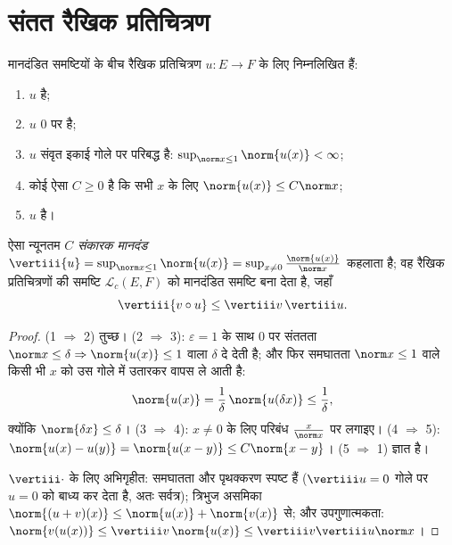\section{संतत रैखिक प्रतिचित्रण}

\begin{theorem}[अभिलक्षण]\label{thm:b2:nvs:continuouslinear}
मानदंडित समष्टियों के बीच रैखिक प्रतिचित्रण $u \colon E \to F$ के लिए निम्नलिखित 
हैं:
\begin{enumerate}
  \item $u$  है;
  \item $u$ $0$ पर  है;
  \item $u$ संवृत इकाई गोले पर परिबद्ध है: $\sup_{\norm x \leq
        1} \norm{u(x)} < \infty$;
  \item कोई ऐसा $C \geq 0$ है कि सभी $x$ के लिए $\norm{u(x)} \leq C \norm x$;
  \item $u$  है।
\end{enumerate}
ऐसा न्यूनतम $C$ \emph{संकारक मानदंड} $\vertiii{u} = \sup_{\norm x \leq 1}\norm{u(x)} = \sup_{x \neq 0}
\frac{\norm{u(x)}}{\norm x}$ कहलाता
है; वह  रैखिक प्रतिचित्रणों की समष्टि $\mathcal{L}_c(E,
F)$ को मानदंडित समष्टि बना
देता है, जहाँ
\[
\vertiii{v \circ u} \leq \vertiii v\, \vertiii u .
\]
\end{theorem}

\begin{proof}
(1 $\Rightarrow$ 2) तुच्छ। (2 $\Rightarrow$ 3): $\varepsilon = 1$ के साथ $0$ पर संततता $\norm x \leq \delta
\Rightarrow \norm{u(x)} \leq 1$ वाला $\delta$ दे
देती है; और फिर समघातता $\norm x \leq 1$ वाले किसी भी $x$ को उस गोले में उतारकर वापस
ले आती है:
\[
\norm{u(x)} = \frac1\delta\,\norm{u(\delta x)} \leq
\frac1\delta ,
\]
क्योंकि $\norm{\delta x} \leq \delta$। (3 $\Rightarrow$ 4): $x \neq 0$ के लिए परिबंध $\frac{x}{\norm x}$ पर लगाइए। (4 $\Rightarrow$ 5):
$\norm{u(x) - u(y)} = \norm{u(x - y)} \leq
C\norm{x - y}$। (5 $\Rightarrow$ 1) ज्ञात है।

$\vertiii\cdot$ के लिए  अभिगृहीत: समघातता और पृथक्करण स्पष्ट हैं ($\vertiii u = 0$ गोले
पर $u = 0$ को बाध्य कर देता है, अतः सर्वत्र); त्रिभुज असमिका $\norm{(u + v)(x)} \leq
\norm{u(x)} + \norm{v(x)}$ से; और
उपगुणात्मकता: $\norm{v(u(x))}
\leq \vertiii v\,\norm{u(x)} \leq \vertiii v \vertiii u \norm x$।
\end{proof}


